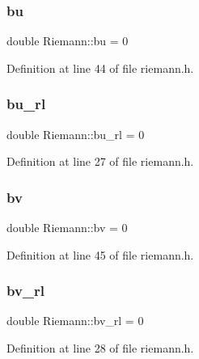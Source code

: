 \subsubsection{\texorpdfstring{bu}{bu}}
{\footnotesize\ttfamily double Riemann\+::bu = 0\hspace{0.3cm}{\ttfamily [private]}}



Definition at line 44 of file riemann.\+h.

\mbox{\label{classRiemann_a83f1429336f5f23f125d97586d915669}} 
\subsubsection{\texorpdfstring{bu\+\_\+rl}{bu\_rl}}
{\footnotesize\ttfamily double Riemann\+::bu\+\_\+rl = 0\hspace{0.3cm}{\ttfamily [private]}}



Definition at line 27 of file riemann.\+h.

\mbox{\label{classRiemann_ae2cd07b9d426b2e8346fa523a2691117}} 
\subsubsection{\texorpdfstring{bv}{bv}}
{\footnotesize\ttfamily double Riemann\+::bv = 0\hspace{0.3cm}{\ttfamily [private]}}



Definition at line 45 of file riemann.\+h.

\mbox{\label{classRiemann_afec414f0ed2e00806f66e3788bffa5bc}} 
\subsubsection{\texorpdfstring{bv\+\_\+rl}{bv\_rl}}
{\footnotesize\ttfamily double Riemann\+::bv\+\_\+rl = 0\hspace{0.3cm}{\ttfamily [private]}}



Definition at line 28 of file riemann.\+h.

